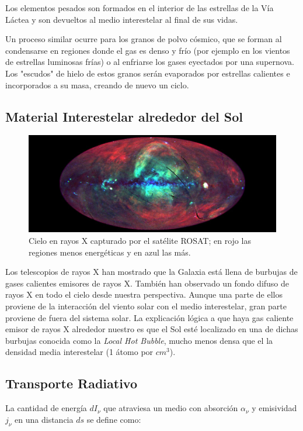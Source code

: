 \documentclass{tufte-handout}
\begin{document}
Los elementos pesados son formados en el interior de las estrellas de la Vía Láctea y son devueltos al medio interestelar al final de sus vidas.

Un proceso similar ocurre para los granos de polvo cósmico, que se forman al condensarse en regiones donde el gas es denso y frío (por ejemplo en los vientos de estrellas luminosas frías) o al enfriarse los gases eyectados por una supernova. Los "escudos" de hielo de estos granos serán evaporados por estrellas calientes e incorporados a su masa, creando de nuevo un ciclo.

\subsection{Material Interestelar alrededor del Sol}

\begin{figure}
  \includegraphics[width=\linewidth]{img/xray}
  \caption{Cielo en rayos X capturado por el satélite ROSAT; en rojo las regiones menos energéticas y en azul las más.}
\end{figure}

Los telescopios de rayos X han mostrado que la Galaxia está llena de burbujas de gases calientes emisores de rayos X. También han observado un fondo difuso de rayos X en todo el cielo desde nuestra perspectiva. Aunque una parte de ellos proviene de la interacción del viento solar con el medio interestelar, gran parte proviene de fuera del sistema solar. La explicación lógica a que haya gas caliente emisor de rayos X alrededor nuestro es que el Sol esté localizado en una de dichas burbujas conocida como la \emph{Local Hot Bubble}, mucho menos densa que el la densidad media interestelar (1 átomo por $cm^3$).

\subsection{Transporte Radiativo}

La cantidad de energía $dI_\nu$ que atraviesa un medio con absorción $\alpha_\nu$ y emisividad $j_\nu$ en una distancia $ds$ se define como:
\end{document}

